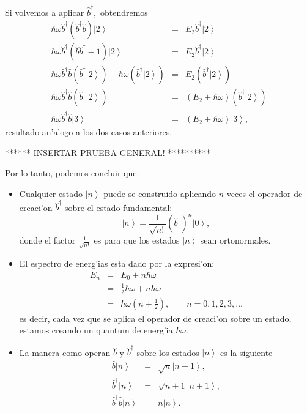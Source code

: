 Si volvemos a aplicar $\hat{b}^{\dagger},$ obtendremos%
\begin{eqnarray}
\hbar\omega\hat{b}^{\dagger}\left( \hat{b}^{\dagger}\hat{b}\right)
\left| 2\right> & = &E_{2}\hat{b}^{\dagger}\left| 2\right>
\\
\hbar\omega\hat{b}^{\dagger}\left( \hat{b}\hat{b}^{\dagger}-1\right)
\left| 2\right> & = &E_{2}\hat{b}^{\dagger}\left| 2\right>
\\
\hbar\omega\hat{b}^{\dagger}\hat{b}\left( \hat{b}^{\dagger}\left|
2\right> \right) -\hbar\omega\left( \hat{b}^{\dagger}\left|
2\right> \right) & = &E_{2}\left( \hat{b}^{\dagger}\left|
2\right> \right) \\
\hbar\omega\hat{b}^{\dagger}\hat{b}\left( \hat{b}^{\dagger}\left|
2\right> \right) & = &\left( E_{2}+\hbar\omega\right) \left( \hat
{b}^{\dagger}\left| 2\right> \right) \\
\hbar\omega\hat{b}^{\dagger}\hat{b}\left| 3\right> & = &\left(
E_{2}+\hbar\omega\right) \left| 3\right> ,
\end{eqnarray}
resultado an'alogo a los dos casos anteriores.

****** INSERTAR PRUEBA GENERAL! **********

Por lo tanto, podemos concluir que:
\begin{itemize}
\item Cualquier estado $\left| n\right> $ puede se construido
aplicando $n$ veces el operador de creaci'on $\hat{b}^{\dagger}$ sobre el
estado fundamental:%
\begin{equation}
\left| n\right> =\frac{1}{\sqrt{n!}}\left( \hat{b}^{\dagger
}\right) ^{n}\left| 0\right> \label{|n>} ,
\end{equation}
donde el factor $\frac{1}{\sqrt{n!}}$ es para que los estados $\left|
n\right> $ sean ortonormales.

\item El espectro de energ'ias esta dado por la expresi'on:%
\begin{eqnarray}
E_{n} & = &E_{0}+n\hbar\omega\\
& = &\frac{1}{2}\hbar\omega+n\hbar\omega\\
& = &\hbar\omega\left( n+\frac{1}{2}\right),\qquad n=0,1,2,3,\dots
\end{eqnarray}
es decir, cada vez que se aplica el operador de creaci'on sobre un estado,
estamos creando un quantum de energ'ia $\hbar\omega.$

\item La manera como operan $\hat{b}$ y $\hat{b}^{\dagger}$ sobre los estados
$\left| n\right> $ es la siguiente%
\begin{eqnarray}
\hat{b}\left| n\right> & = &\sqrt{n}\left| n-1\right>
\label{b|n>} ,\\
\hat{b}^{\dagger}\left| n\right> & = &\sqrt{n+1}\left|
n+1\right> \label{bdag|n>} ,\\
\hat{b}^{\dagger}\hat{b}\left| n\right> & = &n\left|
n\right> \label{bdagb|n>} .
\end{eqnarray}

\end{itemize}

